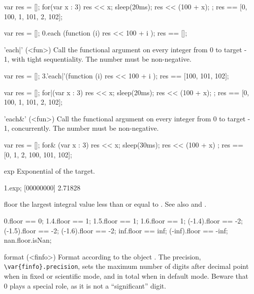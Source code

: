 \begin{urbiscriptapi}
\begin{urbiassert}
{
  var res = [];
  for(var x : 3) { res << x; sleep(20ms); res << (100 + x); };
  res
}
== [0, 100, 1, 101, 2, 102];

{
  var res = [];
  0.each (function (i) { res << 100 + i });
  res
}
== [];
\end{urbiassert}

\item['each|'](<fun>)%
  Call the functional argument  on every integer from 0 to
  target - 1, with tight sequentiality.  The number must be
  non-negative.
\begin{urbiassert}
{
  var res = [];
  3.'each|'(function (i) { res << 100 + i });
  res
}
== [100, 101, 102];

{
  var res = [];
  for|(var x : 3) { res << x; sleep(20ms); res << (100 + x); };
  res
}
== [0, 100, 1, 101, 2, 102];
\end{urbiassert}%

\item['each&'](<fun>)%
  Call the functional argument  on every integer from 0 to
  target - 1, concurrently.  The number must be non-negative.
\begin{urbiassert}
{
  var res = [];
  for& (var x : 3) { res << x; sleep(30ms); res << (100 + x) };
  res
}
== [0, 1, 2, 100, 101, 102];
\end{urbiassert}%

\item[exp]
  Exponential of the target.
\begin{urbiscript}
1.exp;
[00000000] 2.71828
\end{urbiscript}


\item[floor] the largest integral value less than or equal to \this.  See
  also  and .
\begin{urbiassert}
     0.floor ==  0;
   1.4.floor ==  1;     1.5.floor ==  1;    1.6.floor ==  1;
(-1.4).floor == -2;  (-1.5).floor == -2; (-1.6).floor == -2;
   inf.floor == inf; (-inf).floor == -inf;
   nan.floor.isNan;
\end{urbiassert}


\item[format](<finfo>)%
  Format according to the  object .
  The precision, \lstinline|\var{finfo}.precision|, sets the maximum
  number of digits after decimal point when in fixed or scientific
  mode, and in total when in default mode.  Beware that 0 plays a
  special role, as it is not a ``significant'' digit.


\end{urbiscriptapi}
